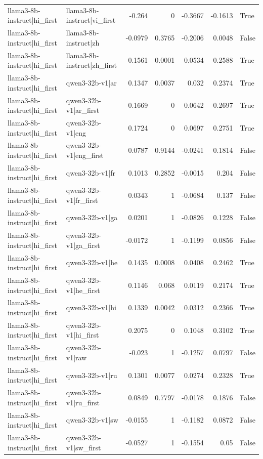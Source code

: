 \begin{table}
\begin{tabular}{l l r r r r l}
llama3-8b-instruct|hi_first & llama3-8b-instruct|vi_first & -0.264 & 0 & -0.3667 & -0.1613 & True \\
llama3-8b-instruct|hi_first & llama3-8b-instruct|zh & -0.0979 & 0.3765 & -0.2006 & 0.0048 & False \\
llama3-8b-instruct|hi_first & llama3-8b-instruct|zh_first & 0.1561 & 0.0001 & 0.0534 & 0.2588 & True \\
llama3-8b-instruct|hi_first & qwen3-32b-v1|ar & 0.1347 & 0.0037 & 0.032 & 0.2374 & True \\
llama3-8b-instruct|hi_first & qwen3-32b-v1|ar_first & 0.1669 & 0 & 0.0642 & 0.2697 & True \\
llama3-8b-instruct|hi_first & qwen3-32b-v1|eng & 0.1724 & 0 & 0.0697 & 0.2751 & True \\
llama3-8b-instruct|hi_first & qwen3-32b-v1|eng_first & 0.0787 & 0.9144 & -0.0241 & 0.1814 & False \\
llama3-8b-instruct|hi_first & qwen3-32b-v1|fr & 0.1013 & 0.2852 & -0.0015 & 0.204 & False \\
llama3-8b-instruct|hi_first & qwen3-32b-v1|fr_first & 0.0343 & 1 & -0.0684 & 0.137 & False \\
llama3-8b-instruct|hi_first & qwen3-32b-v1|ga & 0.0201 & 1 & -0.0826 & 0.1228 & False \\
llama3-8b-instruct|hi_first & qwen3-32b-v1|ga_first & -0.0172 & 1 & -0.1199 & 0.0856 & False \\
llama3-8b-instruct|hi_first & qwen3-32b-v1|he & 0.1435 & 0.0008 & 0.0408 & 0.2462 & True \\
llama3-8b-instruct|hi_first & qwen3-32b-v1|he_first & 0.1146 & 0.068 & 0.0119 & 0.2174 & True \\
llama3-8b-instruct|hi_first & qwen3-32b-v1|hi & 0.1339 & 0.0042 & 0.0312 & 0.2366 & True \\
llama3-8b-instruct|hi_first & qwen3-32b-v1|hi_first & 0.2075 & 0 & 0.1048 & 0.3102 & True \\
llama3-8b-instruct|hi_first & qwen3-32b-v1|raw & -0.023 & 1 & -0.1257 & 0.0797 & False \\
llama3-8b-instruct|hi_first & qwen3-32b-v1|ru & 0.1301 & 0.0077 & 0.0274 & 0.2328 & True \\
llama3-8b-instruct|hi_first & qwen3-32b-v1|ru_first & 0.0849 & 0.7797 & -0.0178 & 0.1876 & False \\
llama3-8b-instruct|hi_first & qwen3-32b-v1|sw & -0.0155 & 1 & -0.1182 & 0.0872 & False \\
llama3-8b-instruct|hi_first & qwen3-32b-v1|sw_first & -0.0527 & 1 & -0.1554 & 0.05 & False \\

\end{tabular}
\end{table}
